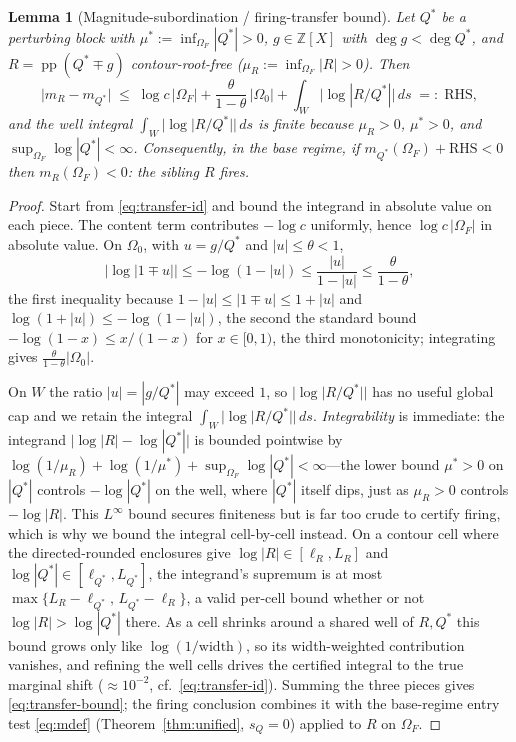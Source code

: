 \documentclass[11pt,reqno]{amsart}
\theoremstyle{plain}
\newtheorem{lemma}[theorem]{Lemma}
\theoremstyle{definition}
\newcommand{\Z}{\mathbb{Z}}
\DeclareMathOperator{\pp}{pp}
\begin{document}
\begin{lemma}[Magnitude-subordination / firing-transfer bound]\label{lem:transfer}
Let $Q^*$ be a perturbing block with $\mu^*:=\inf_{\Omega_F}|Q^*|>0$, $g\in\Z[X]$ with
$\deg g<\deg Q^*$, and $R=\pp(Q^*\mp g)$ contour-root-free
($\mu_R:=\inf_{\Omega_F}|R|>0$). Then
\begin{equation}\label{eq:transfer-bound}
  \bigl|m_R-m_{Q^*}\bigr|
  \;\le\;\log c\,|\Omega_F|
  +\frac{\theta}{1-\theta}\,|\Omega_0|
  +\int_{W}\bigl|\log|R/Q^*|\bigr|\,ds\;=:\;\mathrm{RHS},
\end{equation}
and the well integral $\int_{W}|\log|R/Q^*||\,ds$ is finite because $\mu_R>0$, $\mu^*>0$,
and $\sup_{\Omega_F}\log|Q^*|<\infty$. Consequently, in the base regime, if
$m_{Q^*}(\Omega_F)+\mathrm{RHS}<0$ then $m_R(\Omega_F)<0$: the sibling $R$ fires.
\end{lemma}

\begin{proof}
Start from \eqref{eq:transfer-id} and bound the integrand in absolute value on each
piece. The content term contributes $-\log c$ uniformly, hence $\log c\,|\Omega_F|$ in
absolute value. On $\Omega_0$, with $u=g/Q^*$ and $|u|\le\theta<1$,
\[
  \bigl|\log|1\mp u|\bigr|\le-\log(1-|u|)\le\frac{|u|}{1-|u|}\le\frac{\theta}{1-\theta},
\]
the first inequality because $1-|u|\le|1\mp u|\le 1+|u|$ and
$\log(1+|u|)\le-\log(1-|u|)$, the second the standard bound
$-\log(1-x)\le x/(1-x)$ for $x\in[0,1)$, the third monotonicity; integrating gives
$\frac{\theta}{1-\theta}|\Omega_0|$.

On $W$ the ratio $|u|=|g/Q^*|$ may exceed $1$, so $|\log|R/Q^*||$ has no useful global
cap and we retain the integral $\int_W|\log|R/Q^*||\,ds$. \emph{Integrability} is
immediate: the integrand $\bigl|\log|R|-\log|Q^*|\bigr|$ is bounded pointwise by
$\log(1/\mu_R)+\log(1/\mu^*)+\sup_{\Omega_F}\log|Q^*|<\infty$---the lower bound
$\mu^*>0$ on $|Q^*|$ controls $-\log|Q^*|$ on the well, where $|Q^*|$ itself dips, just
as $\mu_R>0$ controls $-\log|R|$. This $L^\infty$
bound secures finiteness but is far too crude to certify firing, which is why we bound
the integral cell-by-cell instead. On a contour cell where the directed-rounded
enclosures give $\log|R|\in[\ell_R,L_R]$ and $\log|Q^*|\in[\ell_{Q^*},L_{Q^*}]$, the
integrand's supremum is at most $\max\{L_R-\ell_{Q^*},\,L_{Q^*}-\ell_R\}$, a valid
per-cell bound whether or not $\log|R|>\log|Q^*|$ there. As a cell shrinks around a
shared well of $R,Q^*$ this bound grows only like $\log(1/\text{width})$, so its
width-weighted contribution vanishes, and refining the well cells drives the certified
integral to the true marginal shift ($\approx10^{-2}$, cf.\ \eqref{eq:transfer-id}).
Summing the three pieces gives \eqref{eq:transfer-bound}; the firing conclusion combines
it with the base-regime entry test \eqref{eq:mdef} (Theorem~\ref{thm:unified}, $s_Q=0$)
applied to $R$ on $\Omega_F$.
\end{proof}
\end{document}
